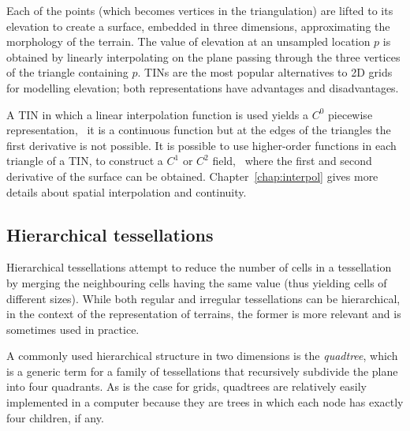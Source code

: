 %

Each of the points (which becomes vertices in the triangulation) are lifted to its elevation to create a surface, embedded in three dimensions, approximating the morphology of the terrain.
The value of elevation at an unsampled location $p$ is obtained by linearly interpolating on the plane passing through the three vertices of the triangle containing $p$. 
TINs are the most popular alternatives to 2D grids for modelling elevation; both representations have advantages and disadvantages.

%
 
A TIN in which a linear interpolation function is used yields a $C^0$ piecewise representation, \ie\ it is a continuous function but at the edges of the triangles the first derivative is not possible.
It is possible to use higher-order functions in each triangle of a TIN, to construct a $C^1$ or $C^2$ field, \ie\ where the first and second derivative of the surface can be obtained. 
Chapter~\ref{chap:interpol} gives more details about spatial interpolation and continuity.



\subsection{Hierarchical tessellations}

Hierarchical tessellations attempt to reduce the number of cells in a tessellation by merging the neighbouring cells having the same value (thus yielding cells of different sizes).
While both regular and irregular tessellations can be hierarchical, in the context of the representation of terrains, the former is more relevant and is sometimes used in practice.


%

A commonly used hierarchical structure in two dimensions is the \emph{quadtree}, which is a generic term for a family of tessellations that recursively subdivide the plane into four quadrants.%
As is the case for grids, quadtrees are relatively easily implemented in a computer because they are trees in which each node has exactly four children, if any.

